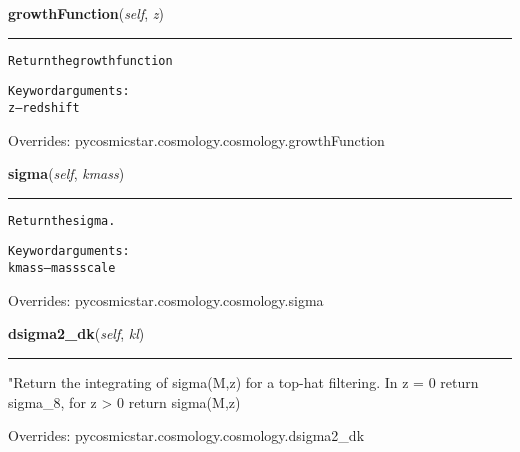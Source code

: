     \vspace{0.5ex}

\hspace{.8\funcindent}\begin{boxedminipage}{\funcwidth}

    \raggedright \textbf{growthFunction}(\textit{self}, \textit{z})

    \vspace{-1.5ex}

    \rule{\textwidth}{0.5\fboxrule}
\setlength{\parskip}{2ex}
\begin{alltt}
Return the growth function

Keyword arguments:
    z -- redshift
\end{alltt}

\setlength{\parskip}{1ex}
      Overrides: pycosmicstar.cosmology.cosmology.growthFunction

    \end{boxedminipage}

    \vspace{0.5ex}

\hspace{.8\funcindent}\begin{boxedminipage}{\funcwidth}

    \raggedright \textbf{sigma}(\textit{self}, \textit{kmass})

    \vspace{-1.5ex}

    \rule{\textwidth}{0.5\fboxrule}
\setlength{\parskip}{2ex}
\begin{alltt}
Return the sigma.

Keyword arguments:
    kmass -- mass scale
\end{alltt}

\setlength{\parskip}{1ex}
      Overrides: pycosmicstar.cosmology.cosmology.sigma

    \end{boxedminipage}

    \vspace{0.5ex}

\hspace{.8\funcindent}\begin{boxedminipage}{\funcwidth}

    \raggedright \textbf{dsigma2\_dk}(\textit{self}, \textit{kl})

    \vspace{-1.5ex}

    \rule{\textwidth}{0.5\fboxrule}
\setlength{\parskip}{2ex}
    "Return the integrating of sigma(M,z) for a top-hat filtering. In z = 0
    return sigma\_8, for z {\textgreater} 0 return sigma(M,z)

\setlength{\parskip}{1ex}
      Overrides: pycosmicstar.cosmology.cosmology.dsigma2\_dk

    \end{boxedminipage}

